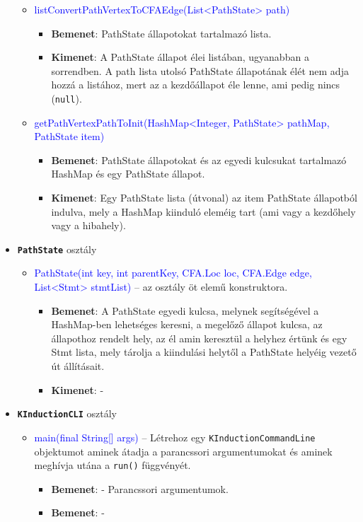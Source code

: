 \begin{itemize}
\begin{itemize}
		\item \textcolor{blue}{listConvertPathVertexToCFAEdge(List<PathState> path)}
		\begin{itemize}
			\item \textbf{Bemenet}: PathState állapotokat tartalmazó lista.
			\item \textbf{Kimenet}: A PathState állapot élei listában, ugyanabban a sorrendben. A path lista utolsó PathState állapotának élét nem adja hozzá a listához, mert az a kezdőállapot éle lenne, ami pedig nincs (\texttt{null}).
		\end{itemize}
	
		\item \textcolor{blue}{getPathVertexPathToInit(HashMap<Integer, PathState> pathMap, PathState item)}
		\begin{itemize}
			\item \textbf{Bemenet}: PathState állapotokat és az egyedi kulcsukat tartalmazó HashMap és egy PathState állapot.
			\item \textbf{Kimenet}: Egy PathState lista (útvonal) az item PathState állapotból indulva, mely a HashMap kiinduló eleméig tart (ami vagy a kezdőhely vagy a hibahely).
		\end{itemize}
	\end{itemize}

	\item \textbf{\texttt{PathState}} osztály
	\begin{itemize}
		\item \textcolor{blue}{PathState(int key, int parentKey, CFA.Loc loc, CFA.Edge edge, List<Stmt> stmtList)} -- az osztály öt elemű konstruktora.
		\begin{itemize}
			\item \textbf{Bemenet}: A PathState egyedi kulcsa, melynek segítségével a HashMap-ben lehetséges keresni, a megelőző állapot kulcsa, az állapothoz rendelt hely, az él amin keresztül a helyhez értünk és egy Stmt lista, mely tárolja a kiindulási helytől a PathState helyéig vezető út állításait. 
			\item \textbf{Kimenet}: -
		\end{itemize}
	\end{itemize}

	\item \textbf{\texttt{KInductionCLI}} osztály
	\begin{itemize}
		\item \textcolor{blue}{main(final String[] args)} -- Létrehoz egy \texttt{KInductionCommandLine} objektumot aminek átadja a parancssori argumentumokat és aminek meghívja utána a \texttt{run()} függvényét.
		\begin{itemize}
			\item \textbf{Bemenet}: - Parancssori argumentumok.
			\item \textbf{Bemenet}: -
		\end{itemize}
		

\end{itemize}
\end{itemize}
